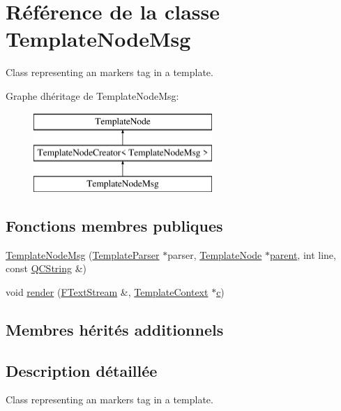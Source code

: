 \hypertarget{class_template_node_msg}{}\section{Référence de la classe Template\+Node\+Msg}
\label{class_template_node_msg}


Class representing an \textquotesingle{}markers\textquotesingle{} tag in a template.  


Graphe d\textquotesingle{}héritage de Template\+Node\+Msg\+:\begin{figure}[H]
\begin{center}
\leavevmode
\includegraphics[height=3.000000cm]{class_template_node_msg}
\end{center}
\end{figure}
\subsection*{Fonctions membres publiques}
\begin{DoxyCompactItemize}
\item 
\hyperlink{class_template_node_msg_a725800e02f30c546f80c9d5aa1cacbc3}{Template\+Node\+Msg} (\hyperlink{class_template_parser}{Template\+Parser} $\ast$parser, \hyperlink{class_template_node}{Template\+Node} $\ast$\hyperlink{class_template_node_a69a306ef84e62af9fe57bf9aacc94536}{parent}, int line, const \hyperlink{class_q_c_string}{Q\+C\+String} \&)
\item 
void \hyperlink{class_template_node_msg_a70b0b8eb859351085eedd06b7259fd8a}{render} (\hyperlink{class_f_text_stream}{F\+Text\+Stream} \&, \hyperlink{class_template_context}{Template\+Context} $\ast$\hyperlink{060__command__switch_8tcl_ab14f56bc3bd7680490ece4ad7815465f}{c})
\end{DoxyCompactItemize}
\subsection*{Membres hérités additionnels}


\subsection{Description détaillée}
Class representing an \textquotesingle{}markers\textquotesingle{} tag in a template. 

